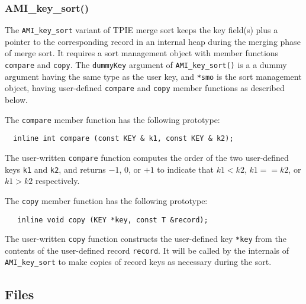 \subsubsection{AMI\_key\_sort()}

The \lstinline|AMI_key_sort| variant of TPIE merge sort keeps the key
field(s) plus a pointer to the corresponding record in an internal
heap during the merging phase of merge sort.  It requires a sort
management object with member functions \lstinline|compare| and
\lstinline|copy|.  The \lstinline|dummyKey| argument of
\lstinline|AMI_key_sort()| is a a dummy argument having the same type
as the user key, and
\lstinline|*smo| is the sort management object, having user-defined
\lstinline|compare| and \lstinline|copy| member functions as described
below.

The \lstinline|compare| member function has the following
prototype:
\begin{lstlisting}
  inline int compare (const KEY & k1, const KEY & k2);
\end{lstlisting}

The user-written \lstinline|compare| function computes the order of
the two user-defined keys \lstinline|k1| and \lstinline|k2|, and
returns $-1$, $0$, or $+1$ to indicate that $k1<k2$, $k1==k2$, or
$k1>k2$ respectively.

The \lstinline|copy| member function has the following prototype:
\begin{lstlisting}
   inline void copy (KEY *key, const T &record);
\end{lstlisting}

The user-written \lstinline|copy| function constructs the user-defined
key \lstinline|*key| from the contents of the user-defined record
\lstinline|record|. It will be called by the internals of
\lstinline|AMI_key_sort| to make copies of record keys as necessary
during the sort.



 


\subsection{Files}
  \btabb
         {}
  \etabb

